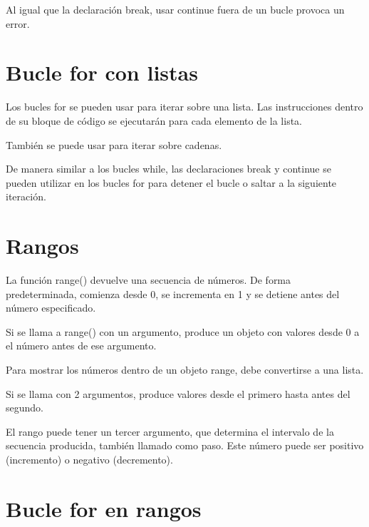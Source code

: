 \documentclass{report}
\begin{document}
{Al igual que la declaración break, usar continue fuera de un bucle provoca un error.


\section{Bucle for con listas}

Los bucles for se pueden usar para iterar sobre una lista. Las instrucciones dentro de su bloque de código se ejecutarán para cada elemento de la lista.


También se puede usar para iterar sobre cadenas.


De manera similar a los bucles while, las declaraciones break y continue se pueden utilizar en los bucles for para detener el bucle o saltar a la siguiente iteración.


\section{Rangos}

La función range() devuelve una secuencia de números. De forma predeterminada, comienza desde 0, se incrementa en 1 y se detiene antes del número especificado.

Si se llama a range() con un argumento, produce un objeto con valores desde 0 a el número antes de ese argumento.


Para mostrar los números dentro de un objeto range, debe convertirse a una lista.

Si se llama con 2 argumentos, produce valores desde el primero hasta antes del segundo.



El rango puede tener un tercer argumento, que determina el intervalo de la secuencia producida, también llamado como paso. Este número puede ser positivo (incremento) o negativo (decremento).


\section{Bucle for en rangos}

}
\end{document}
